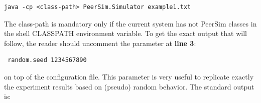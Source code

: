 \documentclass[a4paper,11pt]{article}
\begin{document}
\begin{verbatim}
java -cp <class-path> PeerSim.Simulator example1.txt \end{verbatim}

The class-path is mandatory only if the current system has not PeerSim
classes in the shell CLASSPATH environment variable. To get the exact
output that will follow, the reader should uncomment the parameter
at \textbf{line 3}:

\begin{verbatim} random.seed 1234567890 \end{verbatim}

on top of the configuration file. This parameter is very useful to
replicate exactly the experiment results based on (pseudo) random
behavior. The standard output is:

\scriptsize
\end{document}
